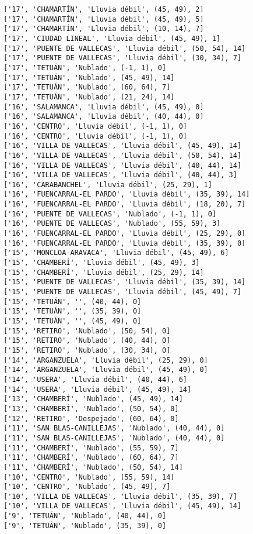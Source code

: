 \documentclass[11pt]{article}
\begin{document}
\begin{Verbatim}[commandchars=\\\{\}]
['17', 'CHAMARTÍN', 'Lluvia débil', (45, 49), 2]
['17', 'CHAMARTÍN', 'Lluvia débil', (45, 49), 5]
['17', 'CHAMARTÍN', 'Lluvia débil', (10, 14), 7]
['17', 'CIUDAD LINEAL', 'Lluvia débil', (45, 49), 1]
['17', 'PUENTE DE VALLECAS', 'Lluvia débil', (50, 54), 14]
['17', 'PUENTE DE VALLECAS', 'Lluvia débil', (30, 34), 7]
['17', 'TETUÁN', 'Nublado', (-1, 1), 0]
['17', 'TETUÁN', 'Nublado', (45, 49), 14]
['17', 'TETUÁN', 'Nublado', (60, 64), 7]
['17', 'TETUÁN', 'Nublado', (21, 24), 14]
['16', 'SALAMANCA', 'Lluvia débil', (45, 49), 0]
['16', 'SALAMANCA', 'Lluvia débil', (40, 44), 0]
['16', 'CENTRO', 'Lluvia débil', (-1, 1), 0]
['16', 'CENTRO', 'Lluvia débil', (-1, 1), 0]
['16', 'VILLA DE VALLECAS', 'Lluvia débil', (45, 49), 14]
['16', 'VILLA DE VALLECAS', 'Lluvia débil', (50, 54), 14]
['16', 'VILLA DE VALLECAS', 'Lluvia débil', (40, 44), 14]
['16', 'VILLA DE VALLECAS', 'Lluvia débil', (40, 44), 3]
['16', 'CARABANCHEL', 'Lluvia débil', (25, 29), 1]
['16', 'FUENCARRAL-EL PARDO', 'Lluvia débil', (35, 39), 14]
['16', 'FUENCARRAL-EL PARDO', 'Lluvia débil', (18, 20), 7]
['16', 'PUENTE DE VALLECAS', 'Nublado', (-1, 1), 0]
['16', 'PUENTE DE VALLECAS', 'Nublado', (55, 59), 3]
['16', 'FUENCARRAL-EL PARDO', 'Lluvia débil', (25, 29), 0]
['16', 'FUENCARRAL-EL PARDO', 'Lluvia débil', (35, 39), 0]
['15', 'MONCLOA-ARAVACA', 'Lluvia débil', (45, 49), 6]
['15', 'CHAMBERÍ', 'Lluvia débil', (45, 49), 3]
['15', 'CHAMBERÍ', 'Lluvia débil', (25, 29), 14]
['15', 'PUENTE DE VALLECAS', 'Lluvia débil', (35, 39), 14]
['15', 'PUENTE DE VALLECAS', 'Lluvia débil', (45, 49), 7]
['15', 'TETUÁN', '', (40, 44), 0]
['15', 'TETUÁN', '', (35, 39), 0]
['15', 'TETUÁN', '', (45, 49), 0]
['15', 'RETIRO', 'Nublado', (50, 54), 0]
['15', 'RETIRO', 'Nublado', (40, 44), 0]
['15', 'RETIRO', 'Nublado', (30, 34), 0]
['14', 'ARGANZUELA', 'Lluvia débil', (25, 29), 0]
['14', 'ARGANZUELA', 'Lluvia débil', (45, 49), 0]
['14', 'USERA', 'Lluvia débil', (40, 44), 6]
['14', 'USERA', 'Lluvia débil', (45, 49), 14]
['13', 'CHAMBERÍ', 'Nublado', (45, 49), 14]
['13', 'CHAMBERÍ', 'Nublado', (50, 54), 0]
['12', 'RETIRO', 'Despejado', (60, 64), 0]
['11', 'SAN BLAS-CANILLEJAS', 'Nublado', (40, 44), 0]
['11', 'SAN BLAS-CANILLEJAS', 'Nublado', (40, 44), 0]
['11', 'CHAMBERÍ', 'Nublado', (55, 59), 7]
['11', 'CHAMBERÍ', 'Nublado', (60, 64), 7]
['11', 'CHAMBERÍ', 'Nublado', (50, 54), 14]
['10', 'CENTRO', 'Nublado', (55, 59), 14]
['10', 'CENTRO', 'Nublado', (45, 49), 7]
['10', 'VILLA DE VALLECAS', 'Lluvia débil', (35, 39), 7]
['10', 'VILLA DE VALLECAS', 'Lluvia débil', (45, 49), 14]
['9', 'TETUÁN', 'Nublado', (40, 44), 0]
['9', 'TETUÁN', 'Nublado', (35, 39), 0]

\end{Verbatim}
\end{document}

